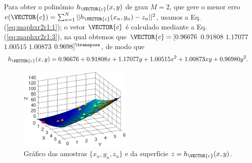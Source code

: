 \begin{SolutionT}\label{sol:theo:maphxr2r1}
Para obter o polinômio $h_{\VECTOR{c}}(x,y)$ de grau $M=2$, 
que gere o menor erro $e(\VECTOR{c}) =  \sum_{n=1}^{N} ||h_{\VECTOR{c}}(x_n,y_n)-z_n||^2$,
usamos a Eq. (\ref{eq:maphxr2r1:1}); o vetor $\VECTOR{c}$ é calculado mediante a Eq. (\ref{eq:maphxr2r1:3}),
na qual obtemos que $\VECTOR{c}=[0.96676$ $0.91808$ $1.17077$ $1.00515$ $1.00873$ $0.9698]^{\transpose}$, de modo que
\begin{equation}
h_{\VECTOR{c}}(x,y) =   0.96676 +0.91808 x +1.17077 y +1.00515 x^2 +1.00873 xy +0.96980 y^2.
\end{equation}
    \begin{figure}[!h]
        \centering
        \includegraphics[width=0.49\textwidth]{chapters/mapeamento/mfiles/mapeamentor2r1/minimizando_hx.eps}
        \caption{Gráfico das amostras $\{x_n,y_n,z_n\}$ e da superfície $z=h_{\VECTOR{c}}(x,y)$.}
        \label{fig:theo:maphxr2r1:xnyn}
    \end{figure}

\end{SolutionT}


